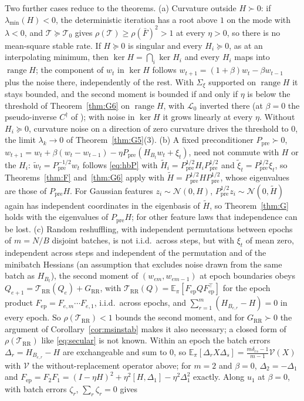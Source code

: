 \documentclass[11pt]{article}
\theoremstyle{remark}
\newcommand{\E}{\mathbb{E}}
\begin{document}
Two further cases reduce to the theorems. (a) Curvature outside $H\succ0$: if $\lambda_{\min}(H)<0$, the deterministic iteration has a root above $1$ on the mode with $\lambda<0$, and $\mathcal T\succeq\mathcal T_0$ gives $\rho(\mathcal T)\ge\rho(\bar F)^2>1$ at every $\eta>0$, so there is no mean-square stable rate. If $H\succeq0$ is singular and every $H_i\succeq0$, as at an interpolating minimum, then $\ker H=\bigcap_i\ker H_i$ and every $H_i$ maps into $\operatorname{range}H$; the component of $w_t$ in $\ker H$ follows $w_{t+1}=(1+\beta)w_t-\beta w_{t-1}$ plus the noise there, independently of the rest. With $\Sigma_\xi$ supported on $\operatorname{range}H$ it stays bounded, and the second moment is bounded if and only if $\eta$ is below the threshold of Theorem~\ref{thm:G6} on $\operatorname{range}H$, with $\mathcal L_0$ inverted there (at $\beta=0$ the pseudo-inverse $C^\dagger$ of \citet{mulayoff2024exact}); with noise in $\ker H$ it grows linearly at every $\eta$. Without $H_i\succeq0$, curvature noise on a direction of zero curvature drives the threshold to $0$, the limit $\lambda_k\to0$ of Theorem~\ref{thm:G5}(3). (b) A fixed preconditioner $P_{\mathrm{pre}}\succ0$, $w_{t+1}=w_t+\beta(w_t-w_{t-1})-\eta P_{\mathrm{pre}}(H_{B_t}w_t+\xi_t)$, need not commute with $H$ or the $H_i$: $\tilde w_t=P_{\mathrm{pre}}^{-1/2}w_t$ follows \eqref{eq:hbP} with $\tilde H_i=P_{\mathrm{pre}}^{1/2}H_iP_{\mathrm{pre}}^{1/2}$ and $\tilde\xi_t=P_{\mathrm{pre}}^{1/2}\xi_t$, so Theorems~\ref{thm:F} and~\ref{thm:G6} apply with $\tilde H=P_{\mathrm{pre}}^{1/2}HP_{\mathrm{pre}}^{1/2}$, whose eigenvalues are those of $P_{\mathrm{pre}}H$. For Gaussian features $z_i\sim\mathcal N(0,H)$, $P_{\mathrm{pre}}^{1/2}z_i\sim\mathcal N(0,\tilde H)$ again has independent coordinates in the eigenbasis of $\tilde H$, so Theorem~\ref{thm:G} holds with the eigenvalues of $P_{\mathrm{pre}}H$; for other feature laws that independence can be lost. (c) Random reshuffling, with independent permutations between epochs of $m=N/B$ disjoint batches, is not i.i.d.\ across steps, but with $\xi_t$ of mean zero, independent across steps and independent of the permutation and of the minibatch Hessians (an assumption that excludes noise drawn from the same batch as $H_{B_t}$), the second moment of $(w_{em},w_{em-1})$ at epoch boundaries obeys $Q_{e+1}=\mathcal T_{\mathrm{RR}}(Q_e)+G_{\mathrm{RR}}$, with $\mathcal T_{\mathrm{RR}}(Q)=\E_\pi[F_{\mathrm{ep}}QF_{\mathrm{ep}}^\top]$ for the epoch product $F_{\mathrm{ep}}=F_{e,m}\cdots F_{e,1}$, i.i.d.\ across epochs, and $\sum_{r=1}^m(H_{B_{e,r}}-H)=0$ in every epoch. So $\rho(\mathcal T_{\mathrm{RR}})<1$ bounds the second moment, and for $G_{\mathrm{RR}}\succ0$ the argument of Corollary~\ref{cor:msinstab} makes it also necessary; a closed form of $\rho(\mathcal T_{\mathrm{RR}})$ like \eqref{eq:secular} is not known. Within an epoch the batch errors $\Delta_r=H_{B_{e,r}}-H$ are exchangeable and sum to $0$, so $\E_\pi[\Delta_rX\Delta_s]=\frac{m\delta_{rs}-1}{m-1}\mathcal V(X)$ with $\mathcal V$ the without-replacement operator above; for $m=2$ and $\beta=0$, $\Delta_2=-\Delta_1$ and $F_{\mathrm{ep}}=F_2F_1=(I-\eta H)^2+\eta^2[H,\Delta_1]-\eta^2\Delta_1^2$ exactly. Along $u_1$ at $\beta=0$, with batch errors $\zeta_r$, $\sum_r\zeta_r=0$ gives 
\end{document}
